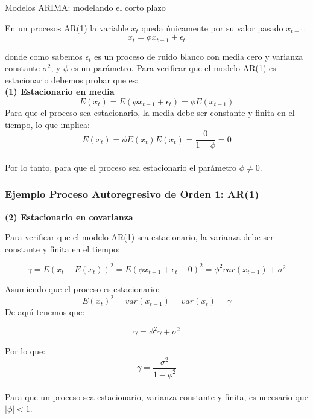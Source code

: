 \documentclass[spanish,xcolor=table]{beamer}
\begin{document}
\begin{section}{Modelos ARIMA: modelando el corto plazo}
\begin{frame}
En un procesos AR(1) la variable $x_t$ queda \'unicamente por su valor pasado $x_{t-1}$:
\begin{equation}
x_t = \phi x_{t-1} + \epsilon_t
\end{equation}

donde como sabemos $\epsilon_t$ es un proceso de ruido blanco con media cero y varianza constante $\sigma^2$, y $\phi$ es un par\'ametro. Para verificar que el modelo AR(1) es estacionario debemos probar que es:\\
\vspace{4mm}	
\textbf{(1) Estacionario en media}
\begin{equation}
E(x_t) = E(\phi x_{t-1} + \epsilon_t)=\phi E(x_{t-1} )
\end{equation}
Para que el proceso sea estacionario, la media debe ser constante y finita en el tiempo, lo que implica:
\begin{equation}
E(x_t) = \phi E(x_{t} )
E(x_t) = \frac{0}{1-\phi}=0
\end{equation}
\\
Por lo tanto, para que el proceso sea estacionario el par\'ametro $\phi \ne 0$.

\end{frame}

\begin{frame}
\frametitle{Ejemplo Proceso Autoregresivo de Orden 1: AR(1)}

\textbf{(2) Estacionario en covarianza}

Para verificar que el modelo AR(1) sea estacionario, la varianza debe ser constante y finita en el tiempo:

\begin{equation}
\gamma = E(x_t-E(x_t))^2 = E(\phi x_{t-1} + \epsilon_t - 0)^2 = \phi^2 var(x_{t-1}) + \sigma^2
\end{equation}

Asumiendo que el proceso es estacionario:
\begin{equation}
E(x_t)^2 = var(x_{t-1}) = var(x_{t}) = \gamma
\end{equation}
De aqu\'{\i} tenemos que:

\begin{equation}
\gamma  = \phi^2 \gamma + \sigma^2
\end{equation}

Por lo que:
\begin{equation}
\gamma  = \frac{\sigma^2}{1-\phi^2}
\end{equation}\\
Para que un proceso sea estacionario, varianza constante y finita, es necesario que $|\phi|< 1$.
\end{frame}


\end{section}
\end{document}
